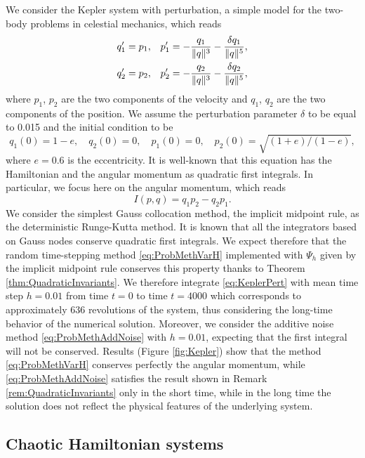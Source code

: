 \documentclass{siamart1116}
\numberwithin{theorem}{section}
\DeclarePairedDelimiter{\norm}{\|}{\|}
\begin{document}
We consider the Kepler system with perturbation, a simple model for the two-body problems in celestial mechanics, which reads
\begin{equation}\label{eq:KeplerPert}
\begin{aligned}
	q_1' &= p_1, && p_1' = -\frac{q_1}{\norm{q}^3} - \frac{\delta q_1}{\norm{q}^5}, \\
	q_2' &= p_2, && p_2' = -\frac{q_2}{\norm{q}^3} - \frac{\delta q_2}{\norm{q}^5},
\end{aligned}
\end{equation}
where $p_1$, $p_2$ are the two components of the velocity and $q_1$, $q_2$ are the two components of the position. We assume the perturbation parameter $\delta$ to be equal to 0.015 and the initial condition to be
\begin{equation}
	q_1(0) = 1 − e,\quad q_2(0) = 0, \quad p_1(0) = 0, \quad p_2(0) = \sqrt{(1 + e)/(1 − e)},
\end{equation}
where $e = 0.6$ is the eccentricity. It is well-known that this equation has the Hamiltonian and the angular momentum as quadratic first integrals. In particular, we focus here on the angular momentum, which reads
\begin{equation}
	I(p, q) = q_1p_2 - q_2p_1.
\end{equation}
We consider the simplest Gauss collocation method, the implicit midpoint rule, as the deterministic Runge-Kutta method. It is known that all the integrators based on Gauss nodes conserve quadratic first integrals. We expect therefore that the random time-stepping method \eqref{eq:ProbMethVarH} implemented with $\Psi_h$ given by the implicit midpoint rule conserves this property thanks to Theorem \ref{thm:QuadraticInvariants}. We therefore integrate \eqref{eq:KeplerPert} with mean time step $h = 0.01$ from time $t = 0$ to time $t = 4000$ which corresponds to approximately $636$ revolutions of the system, thus considering the long-time behavior of the numerical solution. Moreover, we consider the additive noise method \eqref{eq:ProbMethAddNoise} with $h = 0.01$, expecting that the first integral will not be conserved. Results (Figure \ref{fig:Kepler}) show that the method \eqref{eq:ProbMethVarH} conserves perfectly the angular momentum, while \eqref{eq:ProbMethAddNoise} satisfies the result shown in Remark \ref{rem:QuadraticInvariants} only in the short time, while in the long time the solution does not reflect the physical features of the underlying system.

\subsection{Chaotic Hamiltonian systems}
\end{document}
